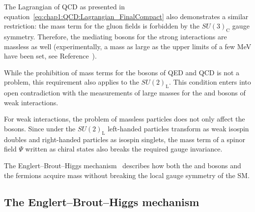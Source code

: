 The Lagrangian of QCD as presented in equation~\ref{eq:chap1:QCD:Lagrangian_FinalCompact} also demonstrates a similar restriction:
the mass term for the gluon fields is forbidden 
by the $SU(3)_\text{C}$ gauge symmetry. Therefore, the mediating bosons for the strong interactions are massless as well (experimentally, a mass as large as the upper limits
of a few MeV have been set, see Reference~\cite{Yndurain:1995uq}).


While the prohibition of mass terms for the bosons of QED and QCD is not a problem, 
this requirement also applies to the $SU(2)_\text{L}$.
This condition enters into open contradiction with the measurements of large masses for the
\PW and \PZ bosons of weak interactions.


For weak interactions, the problem of massless particles does not only affect the bosons. Since under the $SU(2)_\text{L}$ left-handed particles
transform as weak isospin doubles and right-handed particles as isospin singlets, the mass term of a spinor field $\Psi$ written as chiral states also
breaks the required gauge invariance.

The Englert--Brout--Higgs mechanism~\cite{PhysRevLett.13.321, PhysRevLett.13.508, PhysRevLett.13.585} describes how both the \PW and \PZ bosons and the fermions acquire mass without breaking the local gauge symmetry of the SM. 


\subsection{The Englert--Brout--Higgs mechanism}\label{sec:chap1:ParticleMasses:HiggsMechanism}

